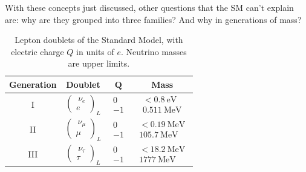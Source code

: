 \documentclass[11pt,a4paper,twoside,openright]{report}
\begin{document}
With these concepts just discussed, other questions that the SM can't explain are: why are they grouped into three families? And why in generations of mass?
\begin{table}[htpb]
    \centering
    \begin{tabular*}{\textwidth}{@{\extracolsep{\fill}}cccc@{}}
        \toprule
        \textbf{Generation} & \textbf{Doublet} & $\boldsymbol{Q}$ & \textbf{Mass} \\
        \midrule
        I &
        $\begin{pmatrix}\ \nu_e \\ e \end{pmatrix}_L$ &
        $\begin{matrix} 0 \\ -1 \end{matrix}$ &
        $\begin{matrix} < 0.8~\text{eV} \\ 0.511~\text{MeV} \end{matrix}$ \\
        \midrule
        II &
        $\begin{pmatrix}\ \nu_\mu \\ \mu \end{pmatrix}_L$ &
        $\begin{matrix} 0 \\ -1 \end{matrix}$ &
        $\begin{matrix} < 0.19~\text{MeV} \\ 105.7~\text{MeV} \end{matrix}$ \\
        \midrule
        III &
        $\begin{pmatrix}\ \nu_\tau \\ \tau \end{pmatrix}_L$ &
        $\begin{matrix} 0 \\ -1 \end{matrix}$ &
        $\begin{matrix} < 18.2~\text{MeV} \\ 1777~\text{MeV} \end{matrix}$ \\
        \bottomrule
    \end{tabular*}
    \caption{Lepton doublets of the Standard Model, with electric charge $Q$ in units of $e$.  Neutrino masses are upper limits.}
    \label{tab:sm_leptons}
\end{table}
\end{document}
